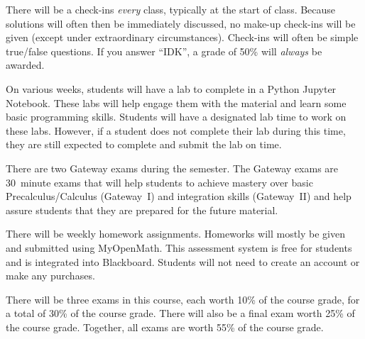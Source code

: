 \documentclass[11pt,letterpaper]{article}
\begin{document}
There will be a check-ins \textit{every} class, typically at the start of class. Because solutions will often then be immediately discussed, no make-up check-ins will be given (except under extraordinary circumstances). Check-ins will often be simple true/false questions. If you answer ``IDK'', a grade of 50\% will \textit{always} be awarded. \pspace


On various weeks, students will have a lab to complete in a Python Jupyter Notebook. These labs will help engage them with the material and learn some basic programming skills. Students will have a designated lab time to work on these labs. However, if a student does not complete their lab during this time, they are still expected to complete and submit the lab on time.
\pspace


There are two Gateway exams during the semester. The Gateway exams are 30~minute exams that will help students to achieve mastery over basic Precalculus/Calculus (Gateway~I) and integration skills (Gateway~II) and help assure students that they are prepared for the future material. 
\pspace



\newpage



There will be weekly homework assignments. Homeworks will mostly be given and submitted using MyOpenMath. This assessment system is free for students and is integrated into Blackboard. Students will not need to create an account or make any purchases. 
\pspace


There will be three exams in this course, each worth 10\% of the course grade, for a total of 30\% of the course grade. There will also be a final exam worth 25\% of the course grade. Together, all exams are worth 55\% of the course grade. 
\pspace
\end{document}
